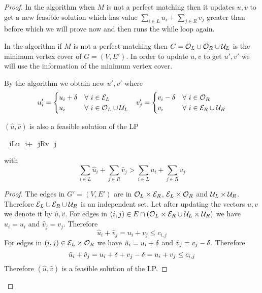 \begin{proof}
	In the algorithm when $M$ is not a perfect matching then it updates $u,v$ to get a new feasible solution which has value $\sum\limits_{i\in L}u_i+\sum\limits_{j\in R}v_j$ greater than before which we will prove now and then runs the while loop again.
	
	In the  algorithm if $M$ is not a perfect matching then $C=\mathcal{O}_L\cup \mathcal{O}_R\cup\mathcal{U}_L$ is the minimum vertex cover of $G=(V,E')$. In order to update $u,v$ to get $u',v'$ we will use the information of the minimum vertex cover. 
	
	By the algorithm we obtain new $u',v'$ where \begin{align*}
		u'_i=\begin{cases}
			u_i+\delta & \forall\ i\in \mathcal{E}_L\\
			u_i & \forall\ i\in \mathcal{O}_L\cup \mathcal{U}_L
		\end{cases}  && v'_j=\begin{cases}
			v_i-\delta & \forall\ i\in \mathcal{O}_R\\
			v_i & \forall\ i\in \mathcal{E}_R\cup \mathcal{U}_R
		\end{cases} 
	\end{align*}
	\begin{claimwidth}
		\begin{claim}{}{}
			$(\hat{u},\hat{v})$ is also a feasible solution of the LP \begin{maxi*}{}{\sum_{i\in L}u_i+\sum_{j\in R}v_j}{}{}
			\end{maxi*} with $$\sum\limits_{i\in L}\hat{u}_i+\sum\limits_{j\in R}\hat{v}_j> \sum\limits_{i\in L}u_i+\sum\limits_{j\in R}v_j$$
		\end{claim}
		\begin{proof}
			The edges in $G'=(V,E')$ are in $\mathcal{O}_L\times \mathcal{E}_R$, $\mathcal{E}_L\times \mathcal{O}_R$ and $\mathcal{U}_L\times \mathcal{U}_R$. Therefore $\mathcal{E}_L\cup \mathcal{E}_R\cup \mathcal{U}_R$ is an independent set. Let after updating the vectors $u,v$ we denote it by $\hat{u},\hat{v}$. For edges in $(i,j)\in E\cap (\mathcal{O}_L\times\mathcal{E}_R \cup   \mathcal{U}_L\times \mathcal{U}_R)$ we have $\hat{u}_i=u_i$ and $\hat{v}_j=v_j$. Therefore  $$\hat{u}_i+\hat{v}_j=u_i+v_j\leq c_{i,j}$$For edges in $(i,j)\in  \mathcal{E}_L\times \mathcal{O}_R$ we have $\hat{u}_i=u_i+\delta$ and $\hat{v}_j=v_j-\delta$. Therefore  $$\hat{u}_i+\hat{v}_j=u_i+\delta+v_j-\delta=u_i+v_j\leq c_{i,j}$$Therefore $(\hat{u},\hat{v})$ is a feasible solution of the LP. 
			

\end{proof}
\end{claimwidth}
\end{proof}
